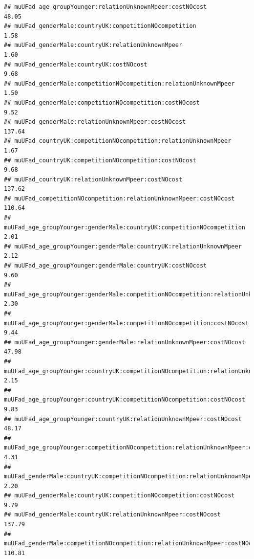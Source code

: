 \documentclass[
]{article}
\begin{document}
\begin{verbatim}
## muUFad_age_groupYounger:relationUnknownMpeer:costNOcost                                          48.05
## muUFad_genderMale:countryUK:competitionNOcompetition                                              1.58
## muUFad_genderMale:countryUK:relationUnknownMpeer                                                  1.60
## muUFad_genderMale:countryUK:costNOcost                                                            9.68
## muUFad_genderMale:competitionNOcompetition:relationUnknownMpeer                                   1.50
## muUFad_genderMale:competitionNOcompetition:costNOcost                                             9.52
## muUFad_genderMale:relationUnknownMpeer:costNOcost                                               137.64
## muUFad_countryUK:competitionNOcompetition:relationUnknownMpeer                                    1.67
## muUFad_countryUK:competitionNOcompetition:costNOcost                                              9.68
## muUFad_countryUK:relationUnknownMpeer:costNOcost                                                137.62
## muUFad_competitionNOcompetition:relationUnknownMpeer:costNOcost                                 110.64
## muUFad_age_groupYounger:genderMale:countryUK:competitionNOcompetition                             2.01
## muUFad_age_groupYounger:genderMale:countryUK:relationUnknownMpeer                                 2.12
## muUFad_age_groupYounger:genderMale:countryUK:costNOcost                                           9.60
## muUFad_age_groupYounger:genderMale:competitionNOcompetition:relationUnknownMpeer                  2.30
## muUFad_age_groupYounger:genderMale:competitionNOcompetition:costNOcost                            9.44
## muUFad_age_groupYounger:genderMale:relationUnknownMpeer:costNOcost                               47.98
## muUFad_age_groupYounger:countryUK:competitionNOcompetition:relationUnknownMpeer                   2.15
## muUFad_age_groupYounger:countryUK:competitionNOcompetition:costNOcost                             9.83
## muUFad_age_groupYounger:countryUK:relationUnknownMpeer:costNOcost                                48.17
## muUFad_age_groupYounger:competitionNOcompetition:relationUnknownMpeer:costNOcost                  4.31
## muUFad_genderMale:countryUK:competitionNOcompetition:relationUnknownMpeer                         2.20
## muUFad_genderMale:countryUK:competitionNOcompetition:costNOcost                                   9.79
## muUFad_genderMale:countryUK:relationUnknownMpeer:costNOcost                                     137.79
## muUFad_genderMale:competitionNOcompetition:relationUnknownMpeer:costNOcost                      110.81

\end{verbatim}
\end{document}
